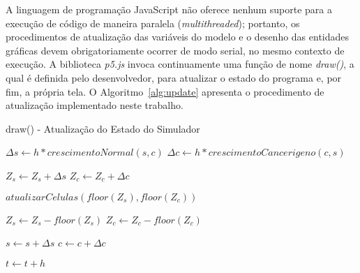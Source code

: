 \documentclass[12pt]{article}
\begin{document}
A linguagem de programação JavaScript não oferece nenhum suporte para a execução de código de maneira paralela (\textit{multithreaded}); portanto, os procedimentos de atualização das variáveis do modelo e o desenho das entidades gráficas devem obrigatoriamente ocorrer de modo serial, no mesmo contexto de execução. A biblioteca \emph{p5.js} invoca continuamente uma função de nome \emph{draw()}, a qual é definida pelo desenvolvedor, para atualizar o estado do programa e, por fim, a própria tela. O Algoritmo~\ref{alg:update} apresenta o procedimento de atualização implementado neste trabalho.

\begin{algorithm}[h]
  \small
  \DontPrintSemicolon
  \caption{draw() - Atualização do Estado do Simulador}
  \label{alg:update}

  $\Delta s \leftarrow h * crescimentoNormal(s, c)$
  $\Delta c \leftarrow h * crescimentoCancerigeno(c, s)$ 
  \BlankLine

  \BlankLine

  $Z_s \leftarrow Z_s + \Delta s$ \;
  $Z_c \leftarrow Z_c + \Delta c$ \;
  \BlankLine

  $atualizarCelulas(floor(Z_s), floor(Z_c))$\;
  \BlankLine

  $Z_s \leftarrow Z_s - floor(Z_s)$ \;
  $Z_c \leftarrow Z_c - floor(Z_c)$ \;
  \BlankLine

  $s \leftarrow s + \Delta s$ \;
  $c \leftarrow c + \Delta c$ \;
  \BlankLine

  $t \leftarrow t + h$ \;
\end{algorithm}
\end{document}

